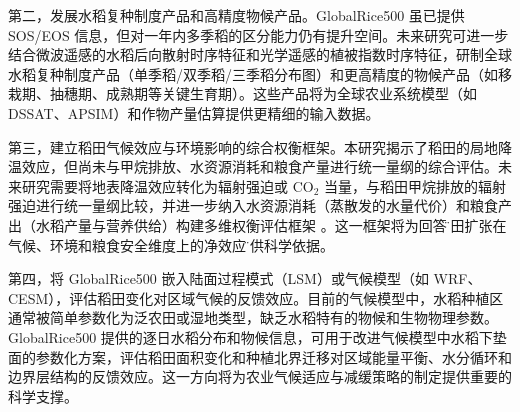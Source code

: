 第二，发展水稻复种制度产品和高精度物候产品。GlobalRice500 虽已提供 SOS/EOS 信息，但对一年内多季稻的区分能力仍有提升空间。未来研究可进一步结合微波遥感的水稻后向散射时序特征和光学遥感的植被指数时序特征，研制全球水稻复种制度产品（单季稻/双季稻/三季稻分布图）和更高精度的物候产品（如移栽期、抽穗期、成熟期等关键生育期）。这些产品将为全球农业系统模型（如 DSSAT、APSIM）和作物产量估算提供更精细的输入数据。

第三，建立稻田气候效应与环境影响的综合权衡框架。本研究揭示了稻田的局地降温效应，但尚未与甲烷排放、水资源消耗和粮食产量进行统一量纲的综合评估。未来研究需要将地表降温效应转化为辐射强迫或 CO$_2$ 当量，与稻田甲烷排放的辐射强迫进行统一量纲比较，并进一步纳入水资源消耗（蒸散发的水量代价）和粮食产出（水稻产量与营养供给）构建多维权衡评估框架 \cite{Qian2023RiceGHG, McDermid2023Irrigation, Zeng2018}。这一框架将为回答\"稻田扩张在气候、环境和粮食安全维度上的净效应\"提供科学依据。

第四，将 GlobalRice500 嵌入陆面过程模式（LSM）或气候模型（如 WRF、CESM），评估稻田变化对区域气候的反馈效应。目前的气候模型中，水稻种植区通常被简单参数化为泛农田或湿地类型，缺乏水稻特有的物候和生物物理参数。GlobalRice500 提供的逐日水稻分布和物候信息，可用于改进气候模型中水稻下垫面的参数化方案，评估稻田面积变化和种植北界迁移对区域能量平衡、水分循环和边界层结构的反馈效应。这一方向将为农业气候适应与减缓策略的制定提供重要的科学支撑。
